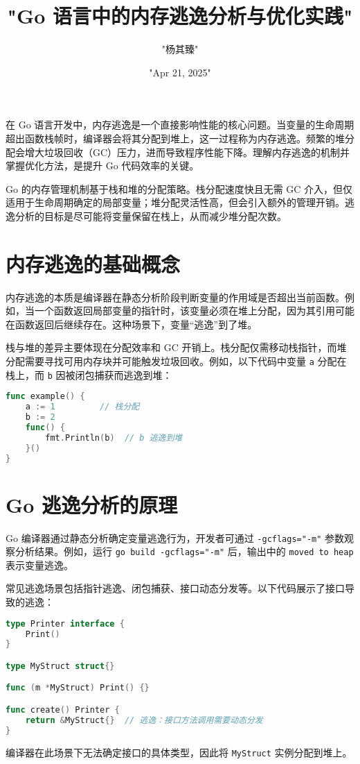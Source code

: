 \title{"Go 语言中的内存逃逸分析与优化实践"}
\author{"杨其臻"}
\date{"Apr 21, 2025"}
\maketitle
在 Go 语言开发中，内存逃逸是一个直接影响性能的核心问题。当变量的生命周期超出函数栈帧时，编译器会将其分配到堆上，这一过程称为内存逃逸。频繁的堆分配会增大垃圾回收（GC）压力，进而导致程序性能下降。理解内存逃逸的机制并掌握优化方法，是提升 Go 代码效率的关键。\par
Go 的内存管理机制基于栈和堆的分配策略。栈分配速度快且无需 GC 介入，但仅适用于生命周期确定的局部变量；堆分配灵活性高，但会引入额外的管理开销。逃逸分析的目标是尽可能将变量保留在栈上，从而减少堆分配次数。\par
\chapter{内存逃逸的基础概念}
内存逃逸的本质是编译器在静态分析阶段判断变量的作用域是否超出当前函数。例如，当一个函数返回局部变量的指针时，该变量必须在堆上分配，因为其引用可能在函数返回后继续存在。这种场景下，变量“逃逸”到了堆。\par
栈与堆的差异主要体现在分配效率和 GC 开销上。栈分配仅需移动栈指针，而堆分配需要寻找可用内存块并可能触发垃圾回收。例如，以下代码中变量 \verb!a! 分配在栈上，而 \verb!b! 因被闭包捕获而逃逸到堆：\par
\begin{lstlisting}[language=go]
func example() {
    a := 1         // 栈分配
    b := 2
    func() {
        fmt.Println(b)  // b 逃逸到堆
    }()
}
\end{lstlisting}
\chapter{Go 逃逸分析的原理}
Go 编译器通过静态分析确定变量逃逸行为，开发者可通过 \verb!-gcflags="-m"! 参数观察分析结果。例如，运行 \verb!go build -gcflags="-m"! 后，输出中的 \verb!moved to heap! 表示变量逃逸。\par
常见逃逸场景包括指针逃逸、闭包捕获、接口动态分发等。以下代码展示了接口导致的逃逸：\par
\begin{lstlisting}[language=go]
type Printer interface {
    Print()
}

type MyStruct struct{}

func (m *MyStruct) Print() {}

func create() Printer {
    return &MyStruct{}  // 逃逸：接口方法调用需要动态分发
}
\end{lstlisting}
编译器在此场景下无法确定接口的具体类型，因此将 \verb!MyStruct! 实例分配到堆上。\par
